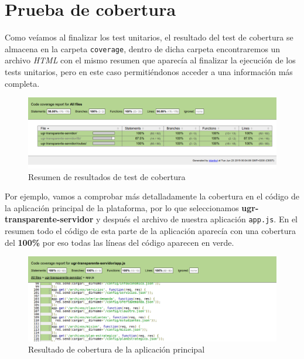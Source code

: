 \section{Prueba de cobertura}

Como veíamos al finalizar los test unitarios, el resultado del test de cobertura se almacena en la carpeta {\tt coverage}, dentro de dicha carpeta encontraremos un archivo \textit{HTML} con el mismo resumen que aparecía al finalizar la ejecución de los tests unitarios, pero en este caso permitiéndonos acceder a una información más completa. 

\begin{figure}[!ht]
	\begin{center}
		\includegraphics[width=1\textwidth]{../images/test_cobertura_01.png}
		\caption{Resumen de resultados de test de cobertura}
		\label{fig:test_cobertura_01}
	\end{center}
\end{figure}

Por ejemplo, vamos a comprobar más detalladamente la cobertura en el código de la aplicación principal de la plataforma, por lo que seleccionamos \textbf{ugr-transparente-servidor} y después el archivo de nuestra aplicación {\tt app.js}. En el resumen todo el código de esta parte de la aplicación aparecía con una cobertura del \textbf{100\%} por eso todas las líneas del código aparecen en verde.

\begin{figure}[!ht]
	\begin{center}
		\includegraphics[width=1\textwidth]{../images/test_cobertura_02.png}
		\caption{Resultado de cobertura de la aplicación principal}
		\label{fig:test_cobertura_02}
	\end{center}
\end{figure}

